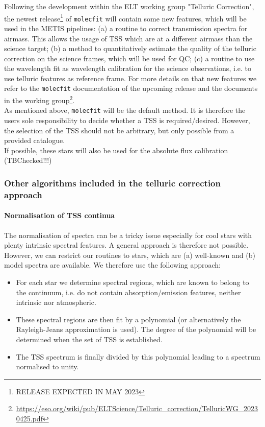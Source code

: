 {Following the development within the \ac{ELT} working group "Telluric Correction", the newest release\footnote{\color{red}RELEASE EXPECTED IN MAY 2023\color{black}} of \texttt{molecfit} will contain some new features, which will be used in the \ac{METIS} pipelines: (a) a routine to correct transmission spectra for airmass. This allows the usage of \ac{TSS} which are at a different airmass than the science target; (b) a method to quantitatively estimate the quality of the telluric correction on the science frames, which will be used for \ac{QC}; (c) a routine to use the wavelength fit as wavelength calibration for the science observations, i.e. to use telluric features as reference frame. For more details on that new features we refer to the \texttt{molecfit} documentation of the upcoming release and the documents in the working group\footnote{\url{https://eso.org/wiki/pub/ELTScience/Telluric_correction/TelluricWG_20230425.pdf}}.\\
As mentioned above, \texttt{molecfit} will be the default method. It is therefore the users sole responsibility to decide whether a \ac{TSS} is required/desired. However, the selection of the \ac{TSS} should not be arbitrary, but only possible from a provided catalogue.\\
If possible, these stars will also be used for the absolute flux calibration \color{red}(TBChecked!!!)\color{black}

\subsubsection{Other algorithms included in the telluric correction approach}\label{ssec:otheralgstellcorr}
\paragraph{Normalisation of \ac{TSS} continua\newline}\label{ssec:spec_normalisation}
The normalisation of spectra can be a tricky issue especially for cool stars with plenty intrinsic spectral features. A general approach is therefore not possible. However, we can restrict our routines to stars, which are (a) well-known and (b) model spectra are available. We therefore use the following approach: 
\begin{itemize}
    \item For each star we determine spectral regions, which are known to belong to the continuum, i.e. do not contain absorption/emission features, neither intrinsic nor atmospheric.
    \item These spectral regions are then fit by a polynomial (or alternatively the Rayleigh-Jeans approximation is used). The degree of the polynomial will be determined when the set of \ac{TSS} is established. 
    \item The \ac{TSS} spectrum is finally divided by this polynomial leading to a spectrum normalised to unity.
\end{itemize} 

}
